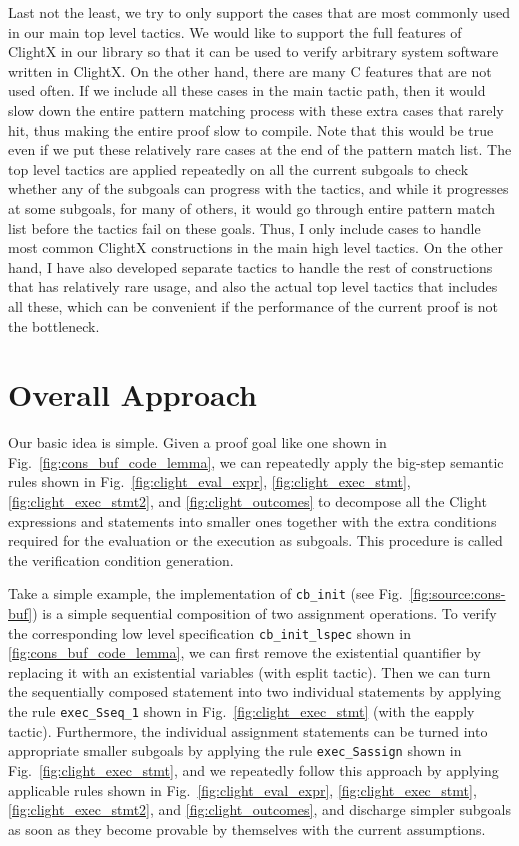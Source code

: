 Last not the least, we try to only support the cases that are most commonly
used in our main top level tactics. We would like to support the full
features of ClightX in our library so that it can be used to verify arbitrary
system software written in ClightX. On the other hand, there are many
C features that are not used often. If we include all these cases in the
main tactic path, then it would slow down the entire pattern matching process
with these extra cases that rarely hit, thus making the entire proof slow to compile.
Note that this would be true even if we put these relatively rare cases
at the end of the pattern match list. The top level tactics are applied
repeatedly on all the current subgoals to check whether any of the subgoals
can progress with the tactics, and while it progresses at some subgoals, for
many of others, it would go through entire pattern match list before the tactics
fail on these goals. Thus, I only include cases to handle most common ClightX
constructions in the main high level tactics.
On the other hand, I have also developed separate tactics to handle the rest
of constructions that has relatively rare usage, and also the actual top
level tactics that includes all these, which can be convenient if the performance
of the current proof is not the bottleneck.


\section{Overall Approach}
\label{sec:approach}

Our basic idea is simple. Given a proof goal like one shown in Fig.~\ref{fig:cons_buf_code_lemma}, we can repeatedly apply the big-step
semantic rules shown in Fig.~\ref{fig:clight_eval_expr}, \ref{fig:clight_exec_stmt},
\ref{fig:clight_exec_stmt2}, and \ref{fig:clight_outcomes} to decompose all
the Clight expressions and statements into smaller ones together with
the extra conditions required for the evaluation or the execution as subgoals.
This procedure is called the verification condition generation. 

Take a simple example, the implementation of \texttt{cb\_init} (see
Fig.~\ref{fig:source:cons-buf}) is a simple sequential composition of
two assignment operations. To verify the corresponding low level specification
\texttt{cb\_init\_lspec} shown in \ref{fig:cons_buf_code_lemma}, we can first
remove the existential quantifier by replacing it with an existential
variables (with \textsf{esplit} tactic). Then we can turn the sequentially
composed statement into two individual statements by applying the rule
\texttt{exec\_Sseq\_1} shown in Fig.~\ref{fig:clight_exec_stmt} (with
the \textsf{eapply} tactic). Furthermore, the individual assignment
statements can be turned into appropriate smaller subgoals
by applying the rule \texttt{exec\_Sassign} shown in
Fig.~\ref{fig:clight_exec_stmt}, and we repeatedly follow this approach
by applying applicable rules shown in Fig.~\ref{fig:clight_eval_expr},
\ref{fig:clight_exec_stmt}, \ref{fig:clight_exec_stmt2}, and
\ref{fig:clight_outcomes}, and discharge simpler subgoals as soon as
they become provable by themselves with the current assumptions.

